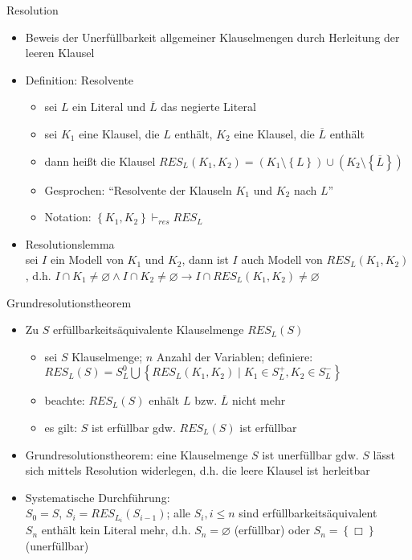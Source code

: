 \begin{frame}{Resolution}
	\begin{itemize}
		\item Beweis der Unerfüllbarkeit allgemeiner Klauselmengen durch Herleitung der leeren Klausel
		\item Definition: Resolvente
		\begin{itemize}
			\item sei $L$ ein Literal und $\overline{L}$ das negierte Literal
			\item sei $K_1$ eine Klausel, die $L$ enthält, $K_2$ eine Klausel, die $\overline{L}$ enthält
			\item dann heißt die Klausel $RES_L(K_1, K_2)=\left(K_1 \setminus \left\{L\right\}\right) \cup \left(K_2 \setminus \left\{\overline{L}\right\}\right)$
			\item Gesprochen: "`Resolvente der Klauseln $K_1$ und $K_2$ nach $L$"'
			\item Notation: $\left\{K_1, K_2\right\} \vdash_{res} RES_L$
		\end{itemize}
		\item Resolutionslemma\\
		sei $I$ ein Modell von $K_1$ und $K_2$, dann ist $I$ auch Modell von $RES_L(K_1, K_2)$, d.h. $I \cap K_1 \neq \varnothing \land I \cap K_2 \neq \varnothing \rightarrow I \cap RES_L(K_1, K_2) \neq \varnothing$
	\end{itemize}
\end{frame}


\begin{frame}{Grundresolutionstheorem}
	\begin{itemize}
		\item Zu $S$ erfüllbarkeitsäquivalente Klauselmenge $RES_L(S)$
		\begin{itemize}
			\item sei $S$ Klauselmenge; $n$ Anzahl der Variablen; definiere:\\
			$RES_L(S)=S_L^0 \bigcup \left\{RES_L(K_1, K_2) \mid K_1 \in S_L^+, K_2 \in S_L^-\right\}$
			\item beachte: $RES_L(S)$ enhält $L$ bzw. $\overline{L}$ nicht mehr
			\item es gilt: $S$ ist erfüllbar gdw. $RES_L(S)$ ist erfüllbar
		\end{itemize}
		\item Grundresolutionstheorem: eine Klauselmenge $S$ ist unerfüllbar gdw. $S$ lässt sich mittels Resolution widerlegen, d.h. die leere Klausel ist herleitbar
		\item Systematische Durchführung:\\
		$S_0=S$, $S_i=RES_{L_i}\left(S_{i-1}\right)$; alle $S_i, i \leq n$ sind erfüllbarkeitsäquivalent\\
		$S_n$ enthält kein Literal mehr, d.h. $S_n=\varnothing$ (erfüllbar) oder $S_n=\left\{\Box\right\}$ (unerfüllbar)
	\end{itemize}
\end{frame}

